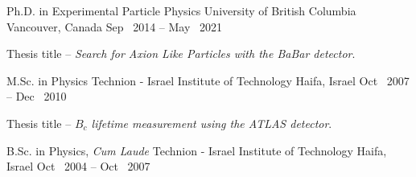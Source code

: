 
\begin{cventries}

  \cventry
    {Ph.D. in Experimental Particle Physics} %
    {University of British Columbia} %
    {Vancouver, Canada} %
    {Sep \ 2014 -- May \ 2021} %
    {
      \begin{cvitems} %
        \item {Thesis title -- \emph{Search for Axion Like Particles with the BaBar detector}.}
      \end{cvitems}
    }

    \cventry
    {M.Sc. in Physics} %
    {Technion - Israel Institute of Technology} %
    {Haifa, Israel} %
    {Oct \ 2007 -- Dec \ 2010} %
    {
      \begin{cvitems} %
        \item {Thesis title -- \emph{$B_c$ lifetime measurement using the ATLAS detector}.}
      \end{cvitems}
    }

  \cventry
    {B.Sc. in Physics, \emph{Cum Laude}} %
    {Technion - Israel Institute of Technology} %
    {Haifa, Israel} %
    {Oct \ 2004 -- Oct \ 2007} %
    {}
    \vspace{-4mm}
\end{cventries}
